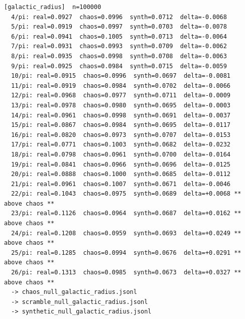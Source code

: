 \documentclass[11pt, letterpaper, openany]{book}
\begin{document}
\begin{empiricalbox}
\begin{lstlisting}[style=terminal]
[galactic_radius]  n=100000
  4/pi: real=0.0927  chaos=0.0996  synth=0.0712  delta=-0.0068
  5/pi: real=0.0919  chaos=0.0997  synth=0.0703  delta=-0.0078
  6/pi: real=0.0941  chaos=0.1005  synth=0.0713  delta=-0.0064
  7/pi: real=0.0931  chaos=0.0993  synth=0.0709  delta=-0.0062
  8/pi: real=0.0935  chaos=0.0998  synth=0.0708  delta=-0.0063
  9/pi: real=0.0925  chaos=0.0984  synth=0.0715  delta=-0.0059
  10/pi: real=0.0915  chaos=0.0996  synth=0.0697  delta=-0.0081
  11/pi: real=0.0919  chaos=0.0984  synth=0.0702  delta=-0.0066
  12/pi: real=0.0968  chaos=0.0977  synth=0.0711  delta=-0.0009
  13/pi: real=0.0978  chaos=0.0980  synth=0.0695  delta=-0.0003
  14/pi: real=0.0961  chaos=0.0998  synth=0.0691  delta=-0.0037
  15/pi: real=0.0867  chaos=0.0984  synth=0.0695  delta=-0.0117
  16/pi: real=0.0820  chaos=0.0973  synth=0.0707  delta=-0.0153
  17/pi: real=0.0771  chaos=0.1003  synth=0.0682  delta=-0.0232
  18/pi: real=0.0798  chaos=0.0961  synth=0.0700  delta=-0.0164
  19/pi: real=0.0841  chaos=0.0966  synth=0.0696  delta=-0.0125
  20/pi: real=0.0888  chaos=0.1000  synth=0.0685  delta=-0.0112
  21/pi: real=0.0961  chaos=0.1007  synth=0.0671  delta=-0.0046
  22/pi: real=0.1043  chaos=0.0975  synth=0.0689  delta=+0.0068 ** above chaos **
  23/pi: real=0.1126  chaos=0.0964  synth=0.0687  delta=+0.0162 ** above chaos **
  24/pi: real=0.1208  chaos=0.0959  synth=0.0693  delta=+0.0249 ** above chaos **
  25/pi: real=0.1285  chaos=0.0994  synth=0.0676  delta=+0.0291 ** above chaos **
  26/pi: real=0.1313  chaos=0.0985  synth=0.0673  delta=+0.0327 ** above chaos **
  -> chaos_null_galactic_radius.jsonl
  -> scramble_null_galactic_radius.jsonl
  -> synthetic_null_galactic_radius.jsonl


\end{lstlisting}
\end{empiricalbox}
\end{document}
